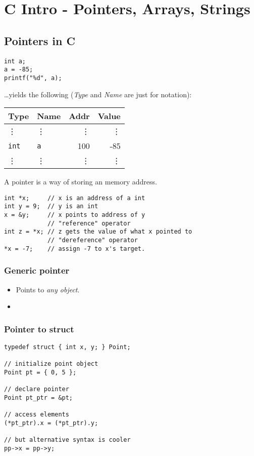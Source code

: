 \chapter{C Intro - Pointers, Arrays, Strings}
\section{Pointers in C}
\begin{verbatim}
int a;
a = -85;
printf("%d", a);
\end{verbatim}
\ldots yields the following (\emph{Type} and \emph{Name} are just for notation):

\noindent
\begin{tabular}{llrr}
	Type & Name & Addr & Value\\ \hline
	\vdots & \vdots & \vdots & \vdots \\
	\texttt{int} & \texttt{a} & 100 & -85 \\
	\vdots & \vdots & \vdots & \vdots \\
\end{tabular}

A pointer is a way of storing an memory address.

\begin{verbatim}
int *x;     // x is an address of a int
int y = 9;  // y is an int
x = &y;     // x points to address of y
            // "reference" operator
int z = *x; // z gets the value of what x pointed to
            // "dereference" operator
*x = -7;    // assign -7 to x's target.
\end{verbatim}

\subsection{Generic pointer}
\begin{itemize}
	\item Points to \emph{any object}.
	
	\item {}
\end{itemize}

\subsection{Pointer to struct}
\begin{verbatim}
typedef struct { int x, y; } Point;

// initialize point object
Point pt = { 0, 5 };

// declare pointer
Point pt_ptr = &pt;

// access elements
(*pt_ptr).x = (*pt_ptr).y;

// but alternative syntax is cooler
pp->x = pp->y;
\end{verbatim}

